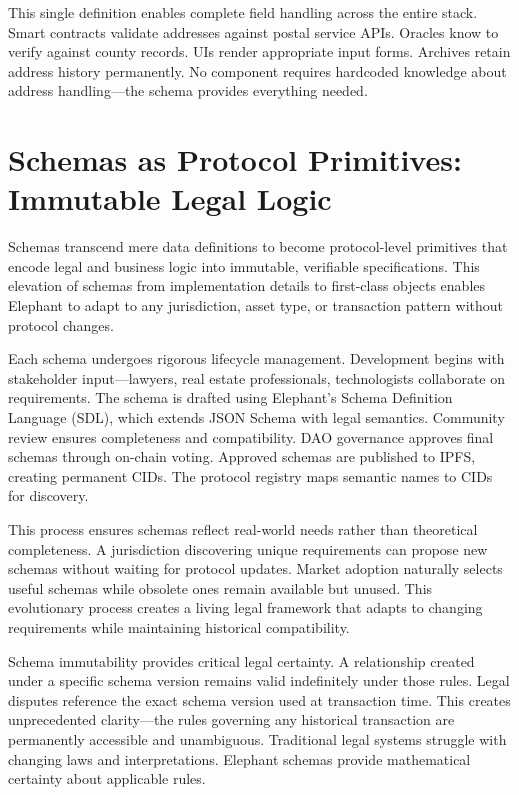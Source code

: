 This single definition enables complete field handling across the entire stack. Smart contracts validate addresses against postal service APIs. Oracles know to verify against county records. UIs render appropriate input forms. Archives retain address history permanently. No component requires hardcoded knowledge about address handling—the schema provides everything needed.

\section{Schemas as Protocol Primitives: Immutable Legal Logic}

Schemas transcend mere data definitions to become protocol-level primitives that encode legal and business logic into immutable, verifiable specifications. This elevation of schemas from implementation details to first-class objects enables Elephant to adapt to any jurisdiction, asset type, or transaction pattern without protocol changes.

Each schema undergoes rigorous lifecycle management. Development begins with stakeholder input—lawyers, real estate professionals, technologists collaborate on requirements. The schema is drafted using Elephant's Schema Definition Language (SDL), which extends JSON Schema with legal semantics. Community review ensures completeness and compatibility. DAO governance approves final schemas through on-chain voting. Approved schemas are published to IPFS, creating permanent CIDs. The protocol registry maps semantic names to CIDs for discovery.

This process ensures schemas reflect real-world needs rather than theoretical completeness. A jurisdiction discovering unique requirements can propose new schemas without waiting for protocol updates. Market adoption naturally selects useful schemas while obsolete ones remain available but unused. This evolutionary process creates a living legal framework that adapts to changing requirements while maintaining historical compatibility.

Schema immutability provides critical legal certainty. A relationship created under a specific schema version remains valid indefinitely under those rules. Legal disputes reference the exact schema version used at transaction time. This creates unprecedented clarity—the rules governing any historical transaction are permanently accessible and unambiguous. Traditional legal systems struggle with changing laws and interpretations. Elephant schemas provide mathematical certainty about applicable rules.


